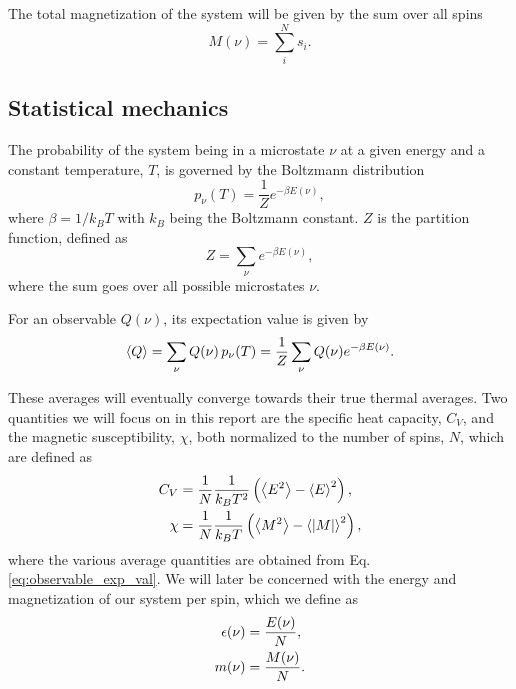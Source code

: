 The total magnetization of the system will be given by the sum over all spins 
\begin{equation}\label{eq:total_magnetization}
    M(\nu) = \sum_{i}^N s_i.
\end{equation}

\subsection{Statistical mechanics}\label{subsec_theory:statistical_mechanics}
The probability of the system being in a microstate $\nu$ at a given energy and a constant temperature, $T$, is governed by the Boltzmann distribution
\begin{equation}\label{eq:boltzmann_distr}
    p_\nu (T) = \frac{1}{Z}e^{-\beta E(\nu)},
\end{equation} 
where $\beta=1/k_B T$ with $k_B$ being the Boltzmann constant. $Z$ is the partition function, defined as 
\begin{equation}\label{eq:partition_function}
    Z = \sum_\nu e^{-\beta E(\nu)},
\end{equation}  
where the sum goes over all possible microstates $\nu$. 

For an observable $Q(\nu)$, its expectation value is given by 
\begin{equation}\label{eq:observable_exp_val}
    \expval{Q} = \sum_{\nu} Q(\nu)\, p_\nu(T) = \frac{1}{Z} \sum_\nu Q(\nu) e^{-\beta E(\nu)}.
\end{equation}

These averages will eventually converge towards their true thermal averages\cite[p. 247]{swendsen}.
Two quantities we will focus on in this report are the specific heat capacity, $C_V$, and the magnetic susceptibility, $\chi$, both normalized to the number of spins, $N$, which are defined as 
\begin{align}
    C_V &= \frac{1}{N}\frac{1}{k_B T^2} \left( \expval{E^2} - \expval{E}^2 \right), \label{eq:C_V} \\ 
    \chi &= \frac{1}{N} \frac{1}{k_B T} \left( \expval{M^2} - \expval{\abs{M}}^2 \right), \label{eq:chi}
\end{align} 
where the various average quantities are obtained from Eq. \eqref{eq:observable_exp_val}. We will later be concerned with the energy and magnetization of our system per spin, which we define as 
\begin{align}
    \epsilon(\nu) &= \frac{E(\nu)}{N}, \label{eq:eps_} \\ 
    m(\nu) &= \frac{M(\nu)}{N}. \label{eq:m_}
\end{align}   

